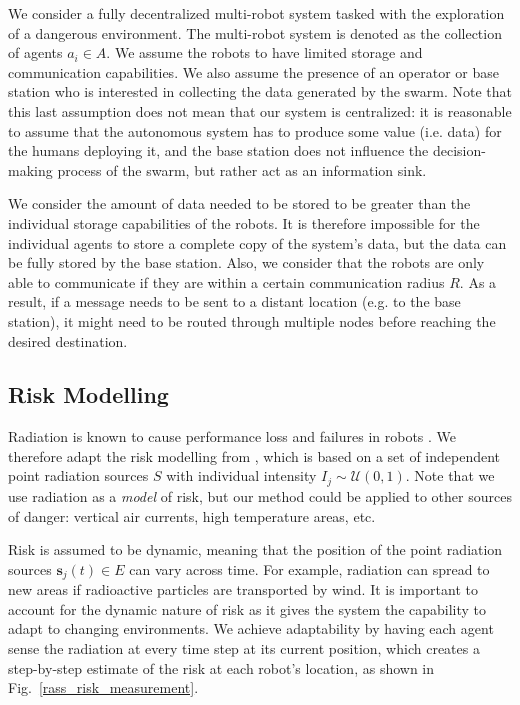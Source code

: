 We consider a fully decentralized multi-robot system tasked with the
exploration of a dangerous environment. The multi-robot system is denoted as the collection 
of agents $a_i \in A$. We assume the robots to have limited storage and communication 
capabilities. We also assume the presence of an operator or base station who is interested 
in collecting the data generated by the swarm. Note that this last assumption does not mean 
that our system is centralized: it is reasonable to assume that the autonomous system has 
to produce some value (i.e. data) for the humans deploying it, and the base station does 
not influence the decision-making process of the swarm, but rather act as an 
information sink.

We consider the amount of data needed to be stored to be greater than the individual 
storage capabilities of the robots. It is therefore impossible for the individual agents 
to store a complete copy of the system’s data, but the data can be fully stored by the 
base station. Also, we consider that the robots are only able to communicate if they are 
within a certain communication radius $R$. As a result, if a message needs to be sent to a 
distant location (e.g. to the base station), it might need to be routed through multiple 
nodes before reaching the desired destination.


\subsection{Risk Modelling}
Radiation is known to cause performance loss and failures in robots \cite{sharp1996radiation,messenger1986effects}. We therefore adapt the risk modelling from \cite{vielfaure2021dora}, which is based on a set of independent point radiation sources $S$ with individual intensity $I_j\sim\mathcal{U}(0, 1)$. Note that we use radiation as
a \emph{model} of risk, but our method could be applied to other sources of danger:
vertical air currents, high temperature areas, etc.

Risk is assumed to be dynamic, meaning that the position of the point radiation sources $\bm{s}_j(t) \in E$ can vary across time. 
For example, radiation can spread to new areas if radioactive particles are
transported by wind. It is important to account for the dynamic nature of risk as it gives 
the system the capability to adapt to changing environments. We achieve adaptability by 
having each agent sense the radiation at every time step at its current position, which creates a step-by-step estimate of the risk at each robot's location, as shown in Fig.~\ref{rass_risk_measurement}.

